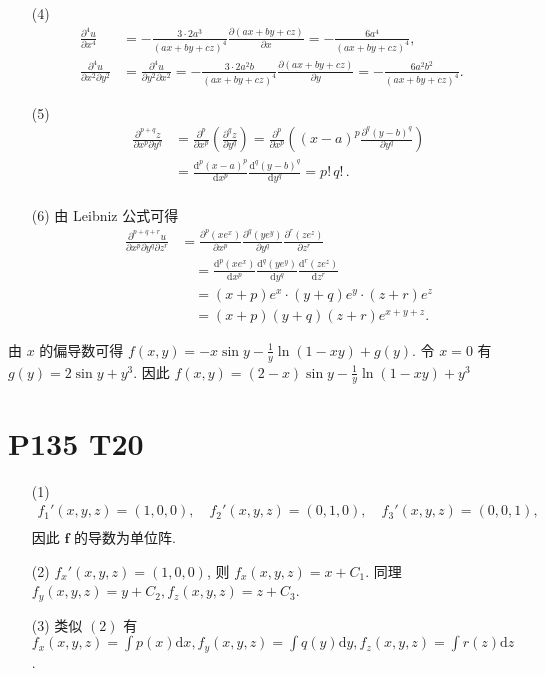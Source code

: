 \documentclass{article}
\newcommand{\dd}{\mathrm{d}}
\begin{document}
\begin{itemize}
    \item [(4)] \begin{align*}
        \frac{\partial^4 u}{\partial x^4} &= -\frac{3 \cdot 2a^3}{(ax + by + cz)^4} \frac{\partial (ax + by + cz)}{\partial x} = -\frac{6a^4}{(ax + by + cz)^4}, \\
        \frac{\partial^4 u}{\partial x^2 \partial y^2} &= \frac{\partial^4 u}{\partial y^2 \partial x^2} = -\frac{3 \cdot 2a^2b}{(ax + by + cz)^4} \frac{\partial (ax + by + cz)}{\partial y} = -\frac{6a^2b^2}{(ax + by + cz)^4}.
    \end{align*}
    \item [(5)] \begin{align*}
        \quad \frac{\partial^{p+q} z}{\partial x^p \partial y^q} &= \frac{\partial^p}{\partial x^p} \left( \frac{\partial^q z}{\partial y^q} \right) = \frac{\partial^p}{\partial x^p} \left( (x-a)^p \frac{\partial^q (y-b)^q}{\partial y^q} \right) \\
        \quad &= \frac{\mathrm{d}^p (x-a)^p}{\mathrm{d}x^p} \frac{\mathrm{d}^q (y-b)^q}{\mathrm{d}y^q} = p! \, q! \, . \\
    \end{align*}
    \item [(6)] 由 Leibniz 公式可得
    \begin{align*}
        \quad \frac{\partial^{p+q+r} u}{\partial x^p \partial y^q \partial z^r} &= \frac{\partial^p (x e^x)}{\partial x^p} \frac{\partial^q (y e^y)}{\partial y^q} \frac{\partial^r (z e^z)}{\partial z^r} \\
        & \quad = \frac{\mathrm{d}^p (x e^x)}{\mathrm{d}x^p} \frac{\mathrm{d}^q (y e^y)}{\mathrm{d}y^q} \frac{\mathrm{d}^r (z e^z)}{\mathrm{d}z^r} \\
        & \quad = (x+p) e^x \cdot (y+q) e^y \cdot (z+r) e^z \\
        & \quad = (x+p)(y+q)(z+r) e^{x+y+z}.
    \end{align*}
\end{itemize}

由 $x$ 的偏导数可得 $f(x, y) = -x \sin y - \frac{1}{y}\ln (1 - xy) + g(y)$. 令 $x = 0$ 有 $g(y) = 2 \sin y + y^3$. 因此 $f(x, y) = (2 - x)\sin y - \frac{1}{y}\ln (1 - xy) + y^3$

\section*{P135 T20}

\begin{itemize}
    \item [(1)] \begin{align*}
        f_1'(x, y, z) = (1, 0, 0), \quad f_2'(x, y, z) = (0, 1, 0), \quad f_3'(x, y, z) = (0, 0, 1), \\
    \end{align*}
    因此 $\boldsymbol{f}$ 的导数为单位阵.
    \item [(2)] $f_x'(x, y, z) = (1, 0, 0)$, 则 $f_x(x, y, z) = x + C_1$. 同理 $f_y(x, y, z) = y + C_2, f_z(x, y, z) = z + C_3$.
    \item [(3)] 类似 $(2)$ 有 $f_x(x, y, z) = \int p(x) \dd x, f_y(x, y, z) = \int q(y) \dd y, f_z(x, y, z) = \int r(z) \dd z$.
\end{itemize}
\end{document}
